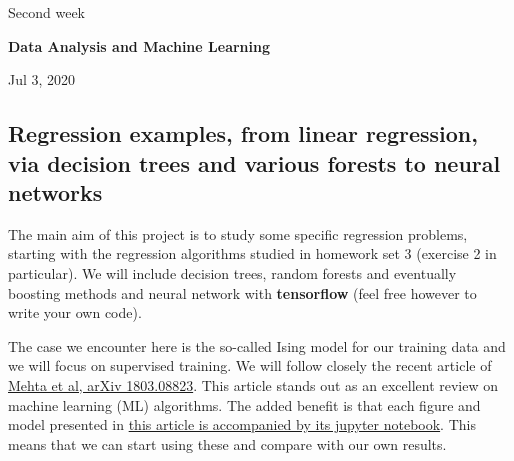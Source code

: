 \documentclass[%
oneside,                 %
final,                   %
10pt]{article}
\begin{document}

\newcommand{\exercisesection}[1]{\subsection*{#1}}






\thispagestyle{empty}

\begin{center}
{\LARGE\bf
\begin{spacing}{1.25}
Second week
\end{spacing}
}
\end{center}


\begin{center}
{\bf Data Analysis and Machine Learning${}^{}$} \\ [0mm]
\end{center}

\begin{center}
\end{center}
    

\begin{center}
Jul 3, 2020
\end{center}

\vspace{1cm}


\subsection*{Regression examples, from linear regression, via decision trees and various forests to neural networks}

The main aim of this project is to study some specific 
regression problems, starting with the regression algorithms studied
in homework set 3 (exercise 2 in particular).
We will include decision trees, random forests and eventually boosting
methods  and neural network with \textbf{tensorflow} (feel free however to write your own code). 

The case we encounter here
is  the so-called Ising model for  our training data and we will
focus on supervised training. We will follow closely the recent
article of \href{{https://arxiv.org/abs/1803.08823}}{Mehta et al, arXiv
1803.08823}. This article stands
out as an excellent review on machine learning (ML) algorithms.
The added benefit is that each figure and
model presented in \href{{https://physics.bu.edu/~pankajm/MLnotebooks.html}}{this article is accompanied by its jupyter
notebook}. This
means that we can start using these and compare with our own results.
\end{document}
